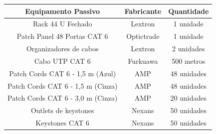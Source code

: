\documentclass[	DIV=calc,%
							paper=a4,%
							fontsize=12pt,%
							onecolumn]{scrartcl}	 					%
\begin{document}
\begin{center}
	\renewcommand{\arraystretch}{1.5}
	\begin{tabular}{|c|c|c|}
		\hline
		\textbf{Equipamento Passivo}      & \textbf{Fabricante} & \multicolumn{1}{l|}{\textbf{Quantidade}} \\ \hline
		Rack 44 U Fechado                 & Lextron             & 1 unidade                                \\ \hline
		Patch Panel 48 Portas CAT 6       & Optictrade          & 1 unidade                                \\ \hline
		Organizadores de cabos            & Lextron             & 2 unidades                               \\ \hline
		Cabo UTP CAT 6                    & Furkuawa            & 500 metros                               \\ \hline
		Patch Cords CAT 6 - 1,5 m (Azul)  & AMP                 & 48 unidades                              \\ \hline
		Patch Cords CAT 6 - 1,5 m (Cinza) & AMP                 & 48 unidades                              \\ \hline
		Patch Cords CAT 6 - 3,0 m (Cinza) & AMP                 & 20 unidades                              \\ \hline
		Outlets de keystones              & Nexans              & 50 unidades                              \\ \hline
		Keystones CAT 6                   & Nexans              & 50 unidades                              \\ \hline
	\end{tabular}
\end{center}	
\clearpage

\recalctypearea
\end{document}
